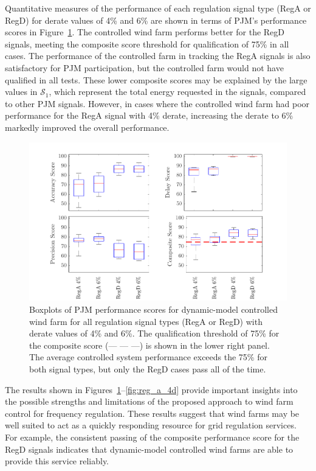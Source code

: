 Quantitative measures of the performance of each regulation signal type (RegA or RegD) for derate values of 4\% and 6\% are shown in terms of PJM's performance scores in Figure~\ref{fig:boxplots}. The controlled wind farm performs better for the RegD signals, meeting the composite score threshold for qualification of 75\% in all cases. The performance of the controlled farm in tracking the RegA signals is also satisfactory for PJM participation, but the controlled farm would not have qualified in all tests. These lower composite scores may be explained by the large values in $\mathcal{S}_1$, which represent the total energy requested in the signals, compared to other PJM signals. However, in cases where the controlled wind farm had poor performance for the RegA signal with 4\% derate, increasing the derate to 6\% markedly improved the overall performance.

\begin{figure}[h]
\begin{center}
\includegraphics[width=\textwidth]{./fig/f9.pdf}
\end{center}
\caption{\label{fig:boxplots}Boxplots of PJM performance scores for dynamic-model controlled wind farm for all regulation signal types (RegA or RegD) with derate values of 4\% and 6\%. The qualification threshold of 75\% for the composite score ({\color{red}--- --- ---}) is shown in the lower right panel. The average controlled system performance exceeds the 75\% for both signal types, but only the RegD cases pass all of the time.}
\end{figure}

The results shown in Figures~\ref{fig:boxplots}--\ref{fig:reg_a_4d} provide important insights into the possible strengths and limitations of the proposed approach to wind farm control for frequency regulation. These results suggest that wind farms may be well suited to act as a quickly responding resource for grid regulation services. For example, the consistent passing of the composite performance score for the RegD signals indicates that dynamic-model controlled wind farms are able to provide this service reliably. 

